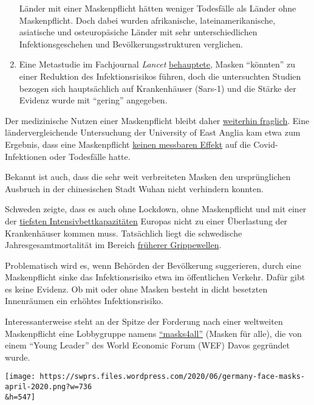 \begin{enumerate}
  Länder mit einer Maskenpflicht hätten weniger Todesfälle als Länder
  ohne Maskenpflicht. Doch dabei wurden afrikanische,
  lateinamerikanische, asiatische und osteuropäsiche Länder mit sehr
  unterschiedlichen Infektionsgeschehen und Bevölkerungsstrukturen
  verglichen.
\item
  Eine Metastudie im Fachjournal \emph{Lancet}
  \href{https://www.thelancet.com/journals/lancet/article/PIIS0140-6736(20)31142-9/fulltext}{behauptete},
  Masken ``könnten'' zu einer Reduktion des Infektionsrisikos führen,
  doch die untersuchten Studien bezogen sich hauptsächlich auf
  Krankenhäuser (Sars-1) und die Stärke der Evidenz wurde mit ``gering''
  angegeben.
\end{enumerate}

Der medizinische Nutzen einer Maskenpflicht bleibt daher
\href{https://www.cidrap.umn.edu/news-perspective/2020/04/commentary-masks-all-covid-19-not-based-sound-data}{weiterhin
fraglich}. Eine länder­ver­gleichende Untersuchung der University of
East Anglia kam etwa zum Ergebnis, dass eine Maskenpflicht
\href{https://www.uea.ac.uk/about/-/new-study-reveals-blueprint-for-getting-out-of-covid-19-lockdown}{keinen
messbaren Effekt} auf die Covid-Infektionen oder Todesfälle hatte.

Bekannt ist auch, dass die sehr weit verbreiteten Masken den
ursprünglichen Ausbruch in der chinesischen Stadt Wuhan nicht verhindern
konnten.

Schweden zeigte, dass es auch ohne Lockdown, ohne Maskenpflicht und mit
einer der
\href{https://link.springer.com/article/10.1007/s00134-012-2627-8}{tiefsten
Intensivbettkapazitäten} Europas nicht zu einer Überlastung der
Krankenhäuser kommen muss. Tatsächlich liegt die schwedische
Jahresgesamtmortalität im Bereich
\href{https://swprs.files.wordpress.com/2020/06/sweden-all-cause-nov-may-1990.jpg}{früherer
Grippewellen}.

Problematisch wird es, wenn Behörden der Bevölkerung suggerieren, durch
eine Maskenpflicht sinke das Infektionsrisiko etwa im öffentlichen
Verkehr. Dafür gibt es keine Evidenz. Ob mit oder ohne Masken besteht in
dicht besetzten Innenräumen ein erhöhtes Infektionsrisiko.

Interessanterweise steht an der Spitze der Forderung nach einer
weltweiten Maskenpflicht eine Lobbygruppe namens
\href{https://masks4all.co/about-us/}{``masks4all''} (Masken für alle),
die von einem ``Young Leader'' des World Economic Forum (WEF) Davos
gegründet wurde.

\texttt{[image: https://swprs.files.wordpress.com/2020/06/germany-face-masks-april-2020.png?w=736\\\&h=547]}

